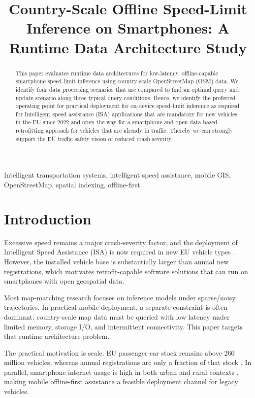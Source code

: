 \documentclass[conference]{IEEEtran}
\title{Country-Scale Offline Speed-Limit Inference on Smartphones: A Runtime Data Architecture Study}
\author{
\IEEEauthorblockN{Anonymous Authors}
\IEEEauthorblockA{Submission prepared for double-blind review}
}
\begin{document}
\maketitle

\begin{abstract}
This paper evaluates runtime data architectures for low-latency, offline-capable smartphone speed-limit inference using country-scale OpenStreetMap (OSM) data. We identify four data processing scenarios that are compared to find an optimal query and update scenario along three typical query conditions. Hence, we identify the preferred operating point for practical deployment for on-device speed-limit inference as required for Intelligent speed assistance (ISA) applications that are mandatory for new vehicles in the EU since 2022 and open the way for a smartphone and open data based retrofitting approach for vehicles that are already in traffic. Thereby we can strongly support the EU traffic safety vision of reduced crash severity.
\end{abstract}

\begin{IEEEkeywords}
Intelligent transportation systems, intelligent speed assistance, mobile GIS, OpenStreetMap, spatial indexing, offline-first
\end{IEEEkeywords}

\section{Introduction}
Excessive speed remains a major crash-severity factor, and the deployment of Intelligent Speed Assistance (ISA) is now required in new EU vehicle types \cite{eu2019_2144,eu2021_1958,eu_mandatory_safety_2024}. However, the installed vehicle base is substantially larger than annual new registrations, which motivates retrofit-capable software solutions that can run on smartphones with open geospatial data.

Most map-matching research focuses on inference models under sparse/noisy trajectories. In practical mobile deployment, a separate constraint is often dominant: country-scale map data must be queried with low latency under limited memory, storage I/O, and intermittent connectivity. This paper targets that runtime architecture problem.

The practical motivation is scale. EU passenger-car stock remains above 260 million vehicles, whereas annual registrations are only a fraction of that stock \cite{eurostat_passenger_cars_2026,acea_registrations_2024}. In parallel, smartphone internet usage is high in both urban and rural contexts \cite{eurostat_mobile_internet_2024}, making mobile offline-first assistance a feasible deployment channel for legacy vehicles.
\end{document}
